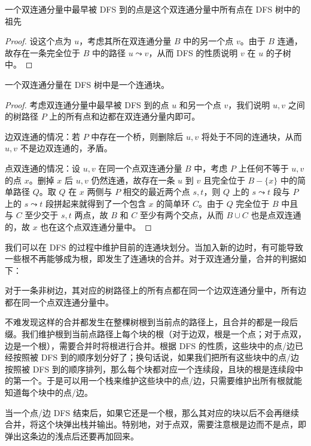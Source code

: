 \begin{lemma}
    一个双连通分量中最早被 DFS 到的点是这个双连通分量中所有点在 DFS 树中的祖先
\end{lemma}
\begin{proof}
    设这个点为 $u$，考虑其所在双连通分量 $B$ 中的另一个点 $v$。由于 $B$ 连通，故存在一条完全位于 $B$ 中的路径 $u\leadsto v$，从而 DFS 的性质说明 $v$ 在 $u$ 的子树中。
\end{proof}
\begin{corollary}
    一个双连通分量在 DFS 树中是一个连通块。
\end{corollary}
\begin{proof}
    考虑双连通分量中最早被 DFS 到的点 $u$ 和另一个点 $v$，我们说明 $u,v$ 之间的树路径 $P$ 上的所有点和边都在双连通分量内即可。

    边双连通的情况：若 $P$ 中存在一个桥，则删除后 $u,v$ 将处于不同的连通块，从而 $u,v$ 不是边双连通的，矛盾。
    
    点双连通的情况：设 $u,v$ 在同一个点双连通分量 $B$ 中，考虑 $P$ 上任何不等于 $u,v$ 的点 $x$。删掉 $x$ 后 $u,v$ 仍然连通，故存在一条 $u$ 到 $v$ 且完全位于 $B-\{x\}$ 中的简单路径 $Q$。取 $Q$ 在 $x$ 两侧与 $P$ 相交的最近两个点 $s,t$，则 $Q$ 上的 $s\leadsto t$ 段与 $P$ 上的 $s\leadsto t$ 段拼起来就得到了一个包含 $x$ 的简单环 $C$。由于 $Q$ 完全位于 $B$ 中且与 $C$ 至少交于 $s,t$ 两点，故 $B$ 和 $C$ 至少有两个交点，从而 $B\cup C$ 也是点双连通的，故 $x$ 也在这个点双连通分量中。
\end{proof}

我们可以在 DFS 的过程中维护目前的连通块划分。当加入新的边时，有可能导致一些根不再能够成为根，即发生了连通块的合并。对于双连通分量，合并的判据如下：
\begin{lemma}
    对于一条非树边，其对应的树路径上的所有点都在同一个边双连通分量中，所有边都在同一个点双连通分量中。
\end{lemma}
不难发现这样的合并都发生在整棵树根到当前点的路径上，且合并的都是一段后缀。我们维护根到当前点路径上每个块的根（对于边双，根是一个点；对于点双，边是一个根），需要合并时将根进行合并。根据 DFS 的性质，这些块中的点/边已经按照被 DFS 到的顺序划分好了；换句话说，如果我们把所有这些块中的点/边按照被 DFS 到的顺序排列，那么每个块都对应一个连续段，且块的根是连续段中的第一个。于是可以用一个栈来维护这些块中的点/边，只需要维护出所有根就能知道每个块中的点/边。

当一个点/边 DFS 结束后，如果它还是一个根，那么其对应的块以后不会再继续合并，将这个块弹出栈并输出。特别地，对于点双，需要注意根是边而不是点，即弹出这条边的浅点后还要再加回来。

